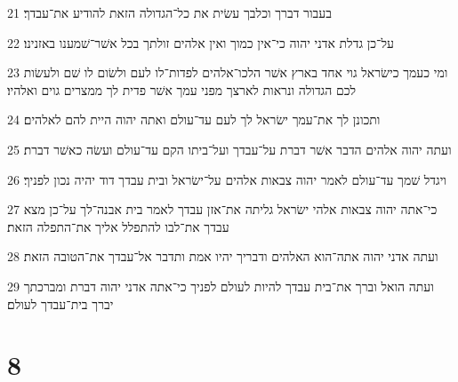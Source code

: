 \par 21 בעבור דברך וכלבך עשׂית את כל־הגדולה הזאת להודיע את־עבדך׃
\par 22 על־כן גדלת אדני יהוה כי־אין כמוך ואין אלהים זולתך בכל אשׁר־שׁמענו באזנינו׃
\par 23 ומי כעמך כישׂראל גוי אחד בארץ אשׁר הלכו־אלהים לפדות־לו לעם ולשׂום לו שׁם ולעשׂות לכם הגדולה ונראות לארצך מפני עמך אשׁר פדית לך ממצרים גוים ואלהיו׃
\par 24 ותכונן לך את־עמך ישׂראל לך לעם עד־עולם ואתה יהוה היית להם לאלהים׃
\par 25 ועתה יהוה אלהים הדבר אשׁר דברת על־עבדך ועל־ביתו הקם עד־עולם ועשׂה כאשׁר דברת׃
\par 26 ויגדל שׁמך עד־עולם לאמר יהוה צבאות אלהים על־ישׂראל ובית עבדך דוד יהיה נכון לפניך׃
\par 27 כי־אתה יהוה צבאות אלהי ישׂראל גליתה את־אזן עבדך לאמר בית אבנה־לך על־כן מצא עבדך את־לבו להתפלל אליך את־התפלה הזאת׃
\par 28 ועתה אדני יהוה אתה־הוא האלהים ודבריך יהיו אמת ותדבר אל־עבדך את־הטובה הזאת׃
\par 29 ועתה הואל וברך את־בית עבדך להיות לעולם לפניך כי־אתה אדני יהוה דברת ומברכתך יברך בית־עבדך לעולם׃

\chapter{8}


